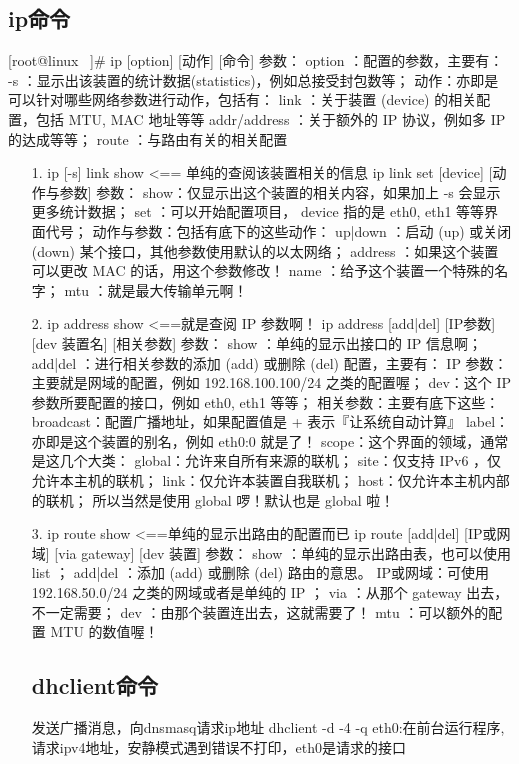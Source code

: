 \documentclass[a4paper,left=1.5cm,right=1.5cm,11pt]{article}
\begin{document}
\subsection{ip命令}
[root@linux ~]# ip [option] [动作] [命令]
参数：
option ：配置的参数，主要有：
    -s ：显示出该装置的统计数据(statistics)，例如总接受封包数等；
动作：亦即是可以针对哪些网络参数进行动作，包括有：
    link  ：关于装置 (device) 的相关配置，包括 MTU, MAC 地址等等
    addr/address ：关于额外的 IP 协议，例如多 IP 的达成等等；
    route ：与路由有关的相关配置
\begin{itemize}
    \item[1.]ip [-s] link show  <== 单纯的查阅该装置相关的信息
            ip link set [device] [动作与参数]
            参数：
            show：仅显示出这个装置的相关内容，如果加上 -s 会显示更多统计数据；
            set ：可以开始配置项目， device 指的是 eth0, eth1 等等界面代号；
            动作与参数：包括有底下的这些动作：
            up|down  ：启动 (up) 或关闭 (down) 某个接口，其他参数使用默认的以太网络；
            address  ：如果这个装置可以更改 MAC 的话，用这个参数修改！
            name     ：给予这个装置一个特殊的名字；
            mtu      ：就是最大传输单元啊！
    \item[2.]ip address show   <==就是查阅 IP 参数啊！
            ip address [add|del] [IP参数] [dev 装置名] [相关参数]
            参数：
            show    ：单纯的显示出接口的 IP 信息啊；
            add|del ：进行相关参数的添加 (add) 或删除 (del) 配置，主要有：
                IP 参数：主要就是网域的配置，例如 192.168.100.100/24 之类的配置喔；
                dev：这个 IP 参数所要配置的接口，例如 eth0, eth1 等等；
                相关参数：主要有底下这些：
                    broadcast：配置广播地址，如果配置值是 + 表示『让系统自动计算』
                    label：亦即是这个装置的别名，例如 eth0:0 就是了！
                    scope：这个界面的领域，通常是这几个大类：
                            global：允许来自所有来源的联机；
                            site：仅支持 IPv6 ，仅允许本主机的联机；
                            link：仅允许本装置自我联机；
                            host：仅允许本主机内部的联机；
                            所以当然是使用 global 啰！默认也是 global 啦！
    \item[3.]ip route show  <==单纯的显示出路由的配置而已
            ip route [add|del] [IP或网域] [via gateway] [dev 装置]
            参数：
            show ：单纯的显示出路由表，也可以使用 list ；
            add|del ：添加 (add) 或删除 (del) 路由的意思。
                IP或网域：可使用 192.168.50.0/24 之类的网域或者是单纯的 IP ；
                via     ：从那个 gateway 出去，不一定需要；
                dev     ：由那个装置连出去，这就需要了！
                mtu     ：可以额外的配置 MTU 的数值喔！
\subsection{dhclient命令}
发送广播消息，向dnsmasq请求ip地址
dhclient -d -4 -q eth0:在前台运行程序,请求ipv4地址，安静模式遇到错误不打印，eth0是请求的接口

\end{itemize}
\end{document}
